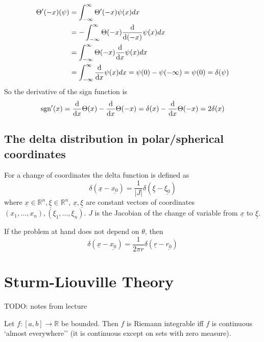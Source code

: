 \begin{example}
	\[
		\begin{aligned}
			\Theta'(-x) (\psi)
				& = \int_{-\infty}^{\infty} \Theta'(-x) \psi(x) dx \\
				& = -\int_{-\infty}^{\infty} \Theta(-x) \diff{}{(-x)} \psi(x) dx \\
				& = \int_{-\infty}^{\infty} \Theta(-x) \diff{}{x} \psi(x) dx \\
				& = \int_{-\infty}^{\infty} \diff{}{x} \psi(x) dx = \psi(0) - \psi(-\infty) = \psi(0) = \delta(\psi)
		\end{aligned}
	\]
	So the derivative of the sign function is
	\[
		\sgn'(x) = \diff{}{x} \Theta(x) - \diff{}{x} \Theta(-x) = \delta(x) - \diff{}{x} \Theta(-x) = 2 \delta(x)
	\]
\end{example}

\subsection{The delta distribution in polar/spherical coordinates}

\begin{definition}
	For a change of coordinates the delta function is defined as
	\[
		\delta(\underline{x} - \underline{x_0}) = \frac{1}{|J|} \delta(\underline{\xi} - \underline{\xi_0})
	\]
	where $\underline{x} \in \mathbb{R}^n, \underline{\xi} \in \mathbb{R}^n$, $\underline{x}, \underline{\xi}$ are constant vectors of coordinates $(x_1, \dots, x_n), (\xi_1, \dots, \xi_n)$. $J$ is the Jacobian of the change of variable from $\underline{x}$ to $\underline{\xi}$.
\end{definition}

\begin{example}
	If the problem at hand does not depend on $\theta$, then
	\[
		\delta(\underline{x} - \underline{x_0}) = \frac{1}{2 \pi r} \delta(\underline{r} - \underline{r_0})
	\]
\end{example}

\section{Sturm-Liouville Theory}

TODO: notes from lecture

\begin{theorem}
	Let $f: [a, b] \rightarrow \mathbb{R}$ be bounded. Then $f$ is Riemann integrable iff $f$ is continuous `almost everywhere'' (it is continuous except on sets with zero measure).
\end{theorem}

